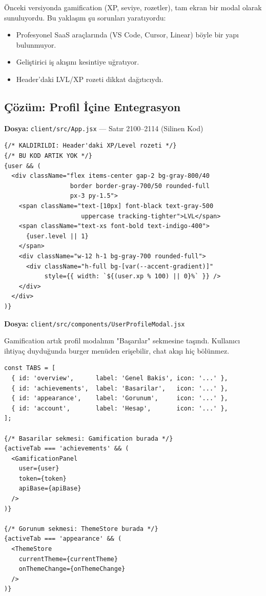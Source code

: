 \documentclass[12pt,a4paper]{article}
\begin{document}
Önceki versiyonda gamification (XP, seviye, rozetler), tam ekran bir modal olarak sunuluyordu. Bu yaklaşım şu sorunları yaratıyordu:

\begin{itemize}[noitemsep]
  \item Profesyonel SaaS araçlarında (VS Code, Cursor, Linear) böyle bir yapı bulunmuyor.
  \item Geliştirici iş akışını kesintiye uğratıyor.
  \item Header'daki LVL/XP rozeti dikkat dağıtıcıydı.
\end{itemize}

\subsection{Çözüm: Profil İçine Entegrasyon}

\textbf{Dosya:} \texttt{client/src/App.jsx} — Satır 2100--2114 (Silinen Kod)

\begin{lstlisting}[language=JSX, caption={Kaldirilan: Header LVL/XP Badge - App.jsx}]
{/* KALDIRILDI: Header'daki XP/Level rozeti */}
{/* BU KOD ARTIK YOK */}
{user && (
  <div className="flex items-center gap-2 bg-gray-800/40
                  border border-gray-700/50 rounded-full
                  px-3 py-1.5">
    <span className="text-[10px] font-black text-gray-500
                     uppercase tracking-tighter">LVL</span>
    <span className="text-xs font-bold text-indigo-400">
      {user.level || 1}
    </span>
    <div className="w-12 h-1 bg-gray-700 rounded-full">
      <div className="h-full bg-[var(--accent-gradient)]"
           style={{ width: `${(user.xp % 100) || 0}%` }} />
    </div>
  </div>
)}
\end{lstlisting}

\textbf{Dosya:} \texttt{client/src/components/UserProfileModal.jsx}

Gamification artık profil modalının "Başarılar" sekmesine taşındı. Kullanıcı ihtiyaç duyduğunda burger menüden erişebilir, chat akışı hiç bölünmez.

\begin{lstlisting}[language=JSX, caption={Profil Modalinda Sekmeli Yapi (Ozet) - UserProfileModal.jsx}]
const TABS = [
  { id: 'overview',      label: 'Genel Bakis', icon: '...' },
  { id: 'achievements',  label: 'Basarilar',   icon: '...' },
  { id: 'appearance',    label: 'Gorunum',     icon: '...' },
  { id: 'account',       label: 'Hesap',       icon: '...' },
];

{/* Basarilar sekmesi: Gamification burada */}
{activeTab === 'achievements' && (
  <GamificationPanel
    user={user}
    token={token}
    apiBase={apiBase}
  />
)}

{/* Gorunum sekmesi: ThemeStore burada */}
{activeTab === 'appearance' && (
  <ThemeStore
    currentTheme={currentTheme}
    onThemeChange={onThemeChange}
  />
)}
\end{lstlisting}
\end{document}

